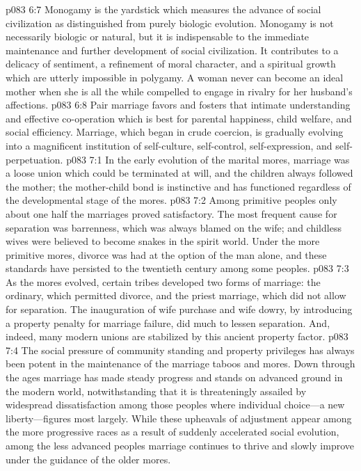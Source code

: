 \vs p083 6:7 Monogamy is the yardstick which measures the advance of social civilization as distinguished from purely biologic evolution. Monogamy is not necessarily biologic or natural, but it is indispensable to the immediate maintenance and further development of social civilization. It contributes to a delicacy of sentiment, a refinement of moral character, and a spiritual growth which are utterly impossible in polygamy. A woman never can become an ideal mother when she is all the while compelled to engage in rivalry for her husband’s affections.\plusone
\vs p083 6:8 Pair marriage favors and fosters that intimate understanding and effective co\hyp{}operation which is best for parental happiness, child welfare, and social efficiency. Marriage, which began in crude coercion, is gradually evolving into a magnificent institution of self\hyp{}culture, self\hyp{}control, self\hyp{}expression, and self\hyp{}perpetuation.
\vs p083 7:1 In the early evolution of the marital mores, marriage was a loose union which could be terminated at will, and the children always followed the mother; the mother\hyp{}child bond is instinctive and has functioned regardless of the developmental stage of the mores.
\vs p083 7:2 Among primitive peoples only about one half the marriages proved satisfactory. The most frequent cause for separation was barrenness, which was always blamed on the wife; and childless wives were believed to become snakes in the spirit world. Under the more primitive mores, divorce was had at the option of the man alone, and these standards have persisted to the twentieth century among some peoples.
\vs p083 7:3 As the mores evolved, certain tribes developed two forms of marriage: the ordinary, which permitted divorce, and the priest marriage, which did not allow for separation. The inauguration of wife purchase and wife dowry, by introducing a property penalty for marriage failure, did much to lessen separation. And, indeed, many modern unions are stabilized by this ancient property factor.
\vs p083 7:4 The social pressure of community standing and property privileges has always been potent in the maintenance of the marriage taboos and mores. Down through the ages marriage has made steady progress and stands on advanced ground in the modern world, notwithstanding that it is threateningly assailed by widespread dissatisfaction among those peoples where individual choice---a new liberty---figures most largely. While these upheavals of adjustment appear among the more progressive races as a result of suddenly accelerated social evolution, among the less advanced peoples marriage continues to thrive and slowly improve under the guidance of the older mores.
